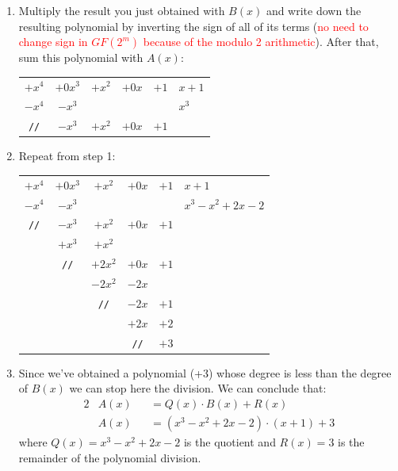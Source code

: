 \documentclass[11pt, a4paper]{article}
\begin{document}
\begin{enumerate}
\begin{center}
\begin{tabular}{ccccc|l}
        \end{tabular}
    \end{center}
    \item Multiply the result you just obtained with $B(x)$ and write down the resulting polynomial by inverting the sign of all of its terms (\textcolor{red}{no need to change sign in $GF(2^m)$ because of the modulo 2 arithmetic}). After that, sum this polynomial with $A(x)$:
    \begin{center}
        \begin{tabular}{ccccc|l}
             $+x^4$ & $+0 x^3$ & $+x^2$ & $+0 x$ & $+1$ & $x+1$ \\
             \cline{6-6}
             $-x^4$ & $-x^3$   &        &        &      & $x^3$\\
             \cline{1-5}
             \texttt{//}     & $-x^3$   & $+x^2$ & $+0x$  & $+1$ &
        \end{tabular}
    \end{center}
    \item Repeat from step 1:
    \begin{center}
        \begin{tabular}{ccccc|l}
             $+x^4$ & $+0 x^3$ & $+x^2$ & $+0 x$ & $+1$ & $x+1$ \\
             \cline{6-6}
             $-x^4$ & $-x^3$   &        &        &      & $x^3-x^2+2x-2$\\
             \cline{1-5}
             \texttt{//}     & $-x^3$   & $+x^2$ & $+0x$  & $+1$ &\\
                    & $+x^3$ & $+x^2$   &        &      &\\
            \cline{2-5}
            & \texttt{//}    & $+2x^2$   & $+0x$   & $+1$ &\\
            &                & $-2x^2$   & $-2x$   &      &\\
            \cline{3-5}
            &       & \texttt{//} & $-2x$ & $+1$ &\\
            &       &             & $+2x$ & $+2$ &\\
            \cline{4-5}
            &       &             & \texttt{//} & $+3$ &
        \end{tabular}
    \end{center}
    \item Since we've obtained a polynomial (+3) whose degree is less than the degree of $B(x)$ we can stop here the division. We can conclude that:
    \begin{alignat*}{2}
        &A(x) &&= Q(x)\cdot B(x) + R(x)\\
        &A(x) &&= (x^3-x^2+2x-2)\cdot(x+1)+3
    \end{alignat*}
    where $Q(x)=x^3-x^2+2x-2$ is the quotient and $R(x)=3$ is the remainder of the polynomial division.
\end{enumerate}
\end{document}
